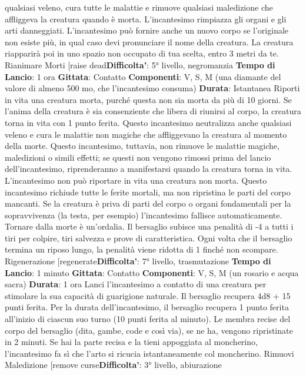 \begin{multicols}{2}
qualsiasi veleno, cura tutte le malattie e rimuove
qualsiasi maledizione che affliggeva la creatura quando
è morta. L’incantesimo rimpiazza gli organi e gli arti
danneggiati.
L’incantesimo può fornire anche un nuovo corpo se
l’originale non esiste più, in qual caso devi pronunciare
il nome della creatura. La creatura riapparirà poi in uno
spazio non occupato di tua scelta, entro 3 metri da te.
Rianimare Morti
[raise dead\textbf{Difficolta'}:
5° livello, negromanzia
\textbf{Tempo di Lancio}: 1 ora
\textbf{Gittata}: Contatto
\textbf{Componenti}: V, S, M (una diamante del valore di
almeno 500 mo, che l’incantesimo consuma)
\textbf{Durata}: Istantanea
Riporti in vita una creatura morta, purché questa non
sia morta da più di 10 giorni. Se l’anima della creatura è
sia consenziente che libera di riunirsi al corpo, la
creatura torna in vita con 1 punto ferita.
Questo incantesimo neutralizza anche qualsiasi veleno
e cura le malattie non magiche che affliggevano la
creatura al momento della morte. Questo incantesimo,
tuttavia, non rimuove le malattie magiche, maledizioni o
simili effetti; se questi non vengono rimossi prima del
lancio dell’incantesimo, riprenderanno a manifestarsi
quando la creatura torna in vita. L’incantesimo non può
riportare in vita una creatura non morta.
Questo incantesimo richiude tutte le ferite mortali, ma
non ripristina le parti del corpo mancanti. Se la creatura
è priva di parti del corpo o organi fondamentali per la
sopravvivenza (la testa, per esempio) l’incantesimo
fallisce automaticamente.
Tornare dalla morte è un’ordalia. Il bersaglio subisce
una penalità di -4 a tutti i tiri per colpire, tiri salvezza e
prove di caratteristica. Ogni volta che il bersaglio
termina un riposo lungo, la penalità viene ridotta di 1
finché non scompare.
Rigenerazione
[regenerate\textbf{Difficolta'}:
7° livello, trasmutazione
\textbf{Tempo di Lancio}: 1 minuto
\textbf{Gittata}: Contatto
\textbf{Componenti}: V, S, M (un rosario e acqua sacra)
\textbf{Durata}: 1 ora
Lanci l’incantesimo a contatto di una creatura per
stimolare la sua capacità di guarigione naturale. Il
bersaglio recupera 4d8 + 15 punti ferita. Per la durata
dell’incantesimo, il bersaglio recupera 1 punto ferita
all’inizio di ciascun suo turno (10 punti ferita al minuto).
Le membra recise del corpo del bersaglio (dita, gambe,
code e così via), se ne ha, vengono ripristinate in 2
minuti. Se hai la parte recisa e la tieni appoggiata al
moncherino, l’incantesimo fa sì che l’arto si ricucia
istantaneamente col moncherino.
Rimuovi Maledizione
[remove curse\textbf{Difficolta'}:
3° livello, abiurazione

\end{multicols}
